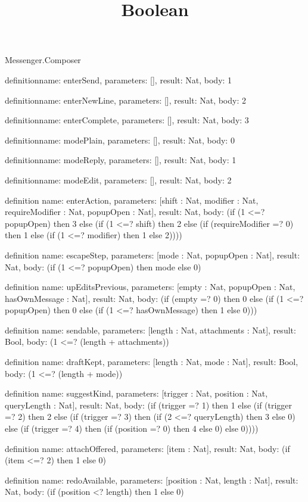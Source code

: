 \begin{lexlean}{Messenger.Composer}
\title{Boolean}
\begin{semanticmodule}
definition{name: enterSend, parameters: [], result: Nat, body: 1}

definition{name: enterNewLine, parameters: [], result: Nat, body: 2}

definition{name: enterComplete, parameters: [], result: Nat, body: 3}

definition{name: modePlain, parameters: [], result: Nat, body: 0}

definition{name: modeReply, parameters: [], result: Nat, body: 1}

definition{name: modeEdit, parameters: [], result: Nat, body: 2}

definition{
  name: enterAction,
  parameters: [shift : Nat, modifier : Nat, requireModifier : Nat, popupOpen : Nat],
  result: Nat,
  body: (if (1 <=? popupOpen) then 3 else (if (1 <=? shift) then 2 else (if (requireModifier =? 0) then 1 else (if (1 <=? modifier) then 1 else 2))))
}

definition{
  name: escapeStep,
  parameters: [mode : Nat, popupOpen : Nat],
  result: Nat,
  body: (if (1 <=? popupOpen) then mode else 0)
}

definition{
  name: upEditsPrevious,
  parameters: [empty : Nat, popupOpen : Nat, hasOwnMessage : Nat],
  result: Nat,
  body: (if (empty =? 0) then 0 else (if (1 <=? popupOpen) then 0 else (if (1 <=? hasOwnMessage) then 1 else 0)))
}

definition{
  name: sendable,
  parameters: [length : Nat, attachments : Nat],
  result: Bool,
  body: (1 <=? (length + attachments))
}

definition{
  name: draftKept,
  parameters: [length : Nat, mode : Nat],
  result: Bool,
  body: (1 <=? (length + mode))
}

definition{
  name: suggestKind,
  parameters: [trigger : Nat, position : Nat, queryLength : Nat],
  result: Nat,
  body: (if (trigger =? 1) then 1 else (if (trigger =? 2) then 2 else (if (trigger =? 3) then (if (2 <=? queryLength) then 3 else 0) else (if (trigger =? 4) then (if (position =? 0) then 4 else 0) else 0))))
}

definition{
  name: attachOffered,
  parameters: [item : Nat],
  result: Nat,
  body: (if (item <=? 2) then 1 else 0)
}

definition{
  name: redoAvailable,
  parameters: [position : Nat, length : Nat],
  result: Nat,
  body: (if (position <? length) then 1 else 0)
}


\end{semanticmodule}
\end{lexlean}
